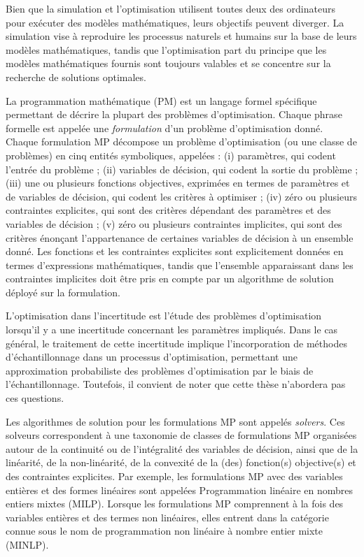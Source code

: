 Bien que la simulation et l'optimisation utilisent toutes deux des ordinateurs pour exécuter des modèles mathématiques, leurs objectifs peuvent diverger. La simulation vise à reproduire les processus naturels et humains sur la base de leurs modèles mathématiques, tandis que l'optimisation part du principe que les modèles mathématiques fournis sont toujours valables et se concentre sur la recherche de solutions optimales. 

La programmation mathématique (PM) est un langage formel spécifique permettant de décrire la plupart des problèmes d'optimisation. Chaque phrase formelle est appelée une \emph{formulation} d'un problème d'optimisation donné. Chaque formulation MP décompose un problème d'optimisation (ou une classe de problèmes) en cinq entités symboliques, appelées : (i) paramètres, qui codent l'entrée du problème ; (ii) variables de décision, qui codent la sortie du problème ; (iii) une ou plusieurs fonctions objectives, exprimées en termes de paramètres et de variables de décision, qui codent les critères à optimiser ; (iv) zéro ou plusieurs contraintes explicites, qui sont des critères dépendant des paramètres et des variables de décision ; (v) zéro ou plusieurs contraintes implicites, qui sont des critères énonçant l'appartenance de certaines variables de décision à un ensemble donné. Les fonctions et les contraintes explicites sont explicitement données en termes d'expressions mathématiques, tandis que l'ensemble apparaissant dans les contraintes implicites doit être pris en compte par un algorithme de solution déployé sur la formulation.

L'optimisation dans l'incertitude est l'étude des problèmes d'optimisation lorsqu'il y a une incertitude concernant les paramètres impliqués. Dans le cas général, le traitement de cette incertitude implique l'incorporation de méthodes d'échantillonnage dans un processus d'optimisation, permettant une approximation probabiliste des problèmes d'optimisation par le biais de l'échantillonnage. Toutefois, il convient de noter que cette thèse n'abordera pas ces questions.


Les algorithmes de solution pour les formulations MP sont appelés \emph{solvers}. Ces solveurs correspondent à une taxonomie de classes de formulations MP organisées autour de la continuité ou de l'intégralité des variables de décision, ainsi que de la linéarité, de la non-linéarité, de la convexité de la (des) fonction(s) objective(s) et des contraintes explicites. Par exemple, les formulations MP avec des variables entières et des formes linéaires sont appelées Programmation linéaire en nombres entiers mixtes (MILP). 
Lorsque les formulations MP comprennent à la fois des variables entières et des termes non linéaires, elles entrent dans la catégorie connue sous le nom de programmation non linéaire à nombre entier mixte (MINLP).

